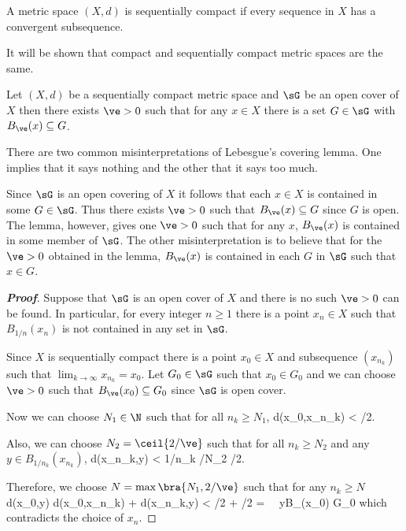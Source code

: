 \begin{definition}
A metric space $(X,d)$ is sequentially compact if every sequence in $X$ has a convergent subsequence.
\end{definition}

\begin{remark}
It will be shown that compact and sequentially compact metric spaces are the same.
\end{remark}

\begin{lemma}\label{lem:lebesgue_covering_metric}
Let $(X,d)$ be a sequentially compact metric space and $\sG$ be an open cover of $X$ then there exists $\ve>0$ such that for any $x\in X$ there is a set $G\in \sG$ with $B_\ve(x) \subseteq G$.
\end{lemma}

\begin{remark}
There are two common misinterpretations of Lebesgue's covering lemma. One implies that it says nothing and the other that it says too much.

Since $\sG$ is an open covering of $X$ it follows that each $x\in X$ is contained in some $G\in \sG$. Thus there exists $\ve>0$ such that $B_\ve(x) \subseteq G$ since $G$ is open. The lemma, however, gives one $\ve>0$ such that for any $x$, $B_\ve(x)$ is contained in some member of $\sG$. The other misinterpretation is to believe that for the $\ve>0$ obtained in the lemma, $B_\ve(x)$ is contained in each $G$ in $\sG$ such that $x\in G$.
\end{remark}



\begin{proof}[\bf Proof]
Suppose that $\sG$ is an open cover of $X$ and there is no such $\ve>0$ can be found. In particular, for every integer $n\geq 1$ there is a point $x_n\in X$ such that $B_{1/n}(x_n)$ is not contained in any set in $\sG$.

Since $X$ is sequentially compact there is a point $x_0\in X$ and subsequence $(x_{n_k})$ such that $\lim_{k\to \infty}x_{n_k} = x_0$. Let $G_0\in \sG$ such that $x_0 \in G_0$ and we can choose $\ve>0$ such that $B_\ve(x_0)\subseteq G_0$ since $\sG$ is open cover.

Now we can choose $N_1\in \N$ such that for all $n_k\geq N_1$,
\be
d(x_0,x_{n_k}) < \ve/2.
\ee

Also, we can choose $N_2 = \ceil{2/\ve}$ such that for all $n_k\geq N_2$ and any $y\in B_{1/n_k}(x_{n_k})$,
\be
d(x_{n_k},y) < 1/n_k /N_2 \leq \ve/2.
\ee

Therefore, we choose $N = \max\bra{N_1,2/\ve}$ such that for any $n_k\geq N$
\be
d(x_0,y) \leq d(x_0,x_{n_{k}}) + d(x_{n_k},y) < \ve/2 + \ve/2 = \ve \ \ra\ y\in B_\ve(x_0) \subseteq G_0
\ee
which contradicts the choice of $x_{n}$.
\end{proof}


